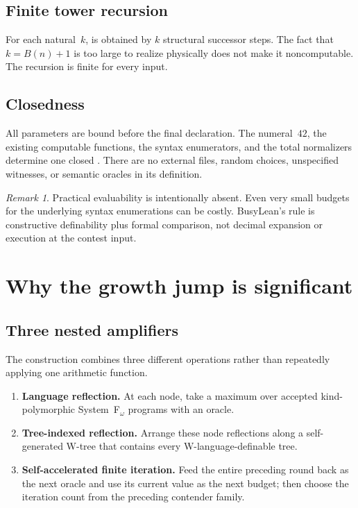 \documentclass[11pt]{article}
\theoremstyle{definition}
\theoremstyle{remark}
\newtheorem{remark}[theorem]{Remark}
\newcommand{\lean}[1]{\texttt{\detokenize{#1}}}
\newcommand{\Bfam}{B}
\begin{document}
\subsection{Finite tower recursion}

For each natural~$k$, \lean{tower11 k} is obtained by $k$ structural successor
steps. The fact that $k=\Bfam(n)+1$ is too large to realize physically does not
make it noncomputable. The recursion is finite for every input.

\subsection{Closedness}

All parameters are bound before the final declaration. The numeral~$42$, the
existing computable functions, the syntax enumerators, and the total
normalizers determine one closed \lean{Nat}. There are no external files,
random choices, unspecified witnesses, or semantic oracles in its definition.

\begin{remark}
Practical evaluability is intentionally absent. Even very small budgets for the
underlying syntax enumerations can be costly. BusyLean's rule is constructive
definability plus formal comparison, not decimal expansion or execution at the
contest input.
\end{remark}

\section{Why the growth jump is significant}

\subsection{Three nested amplifiers}

The construction combines three different operations rather than repeatedly
applying one arithmetic function.

\begin{enumerate}[leftmargin=*]
\item \textbf{Language reflection.} At each node, take a maximum over accepted
  kind-polymorphic System~F$_\omega$ programs with an oracle.
\item \textbf{Tree-indexed reflection.} Arrange these node reflections along a
  self-generated W-tree that contains every W-language-definable tree.
\item \textbf{Self-accelerated finite iteration.} Feed the entire preceding
  round back as the next oracle and use its current value as the next budget;
  then choose the iteration count from the preceding contender family.
\end{enumerate}
\end{document}
